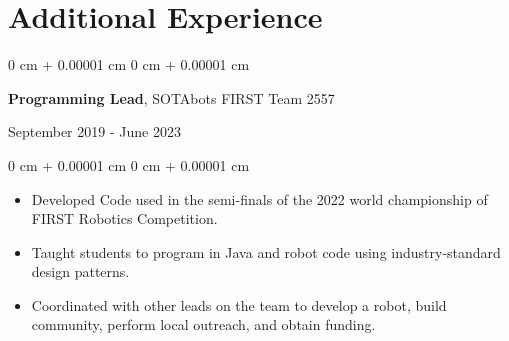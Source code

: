 \documentclass[10pt, article]{article}
\newenvironment{highlights}{
    \begin{itemize}[
        topsep=0.10 cm,
        parsep=0.10 cm,
        partopsep=0pt,
        itemsep=0pt,
        leftmargin=0 cm + 10pt
    ]
}{
    \end{itemize}
} %
\newenvironment{onecolentry}{
    \begin{adjustwidth}{
        0 cm + 0.00001 cm
    }{
        0 cm + 0.00001 cm
    }
}{
    \end{adjustwidth}
} %
\newenvironment{twocolentry}[2][]{
    \onecolentry
    \def\secondColumn{#2}
    \setcolumnwidth{\fill, 4.5 cm}
    \begin{paracol}{2}
}{
    \switchcolumn \raggedleft \secondColumn
    \end{paracol}
    \endonecolentry
} %
\begin{document}
    \section{Additional Experience}
    \begin{samepage}
       

      \begin{twocolentry}
        {September 2019 - June 2023}
        \textbf {Programming Lead}, SOTAbots FIRST Team 2557


      \end{twocolentry}
      \begin{onecolentry}
        \begin{highlights}
      \item Developed Code used in the semi-finals of the 2022 world championship of FIRST Robotics Competition.
      \item Taught students to program in Java and robot code using industry-standard design patterns.
      \item Coordinated with other leads on the team to develop a robot, build community, perform local outreach, and obtain funding.

        \end{highlights}
      \end{onecolentry}

    \end{samepage}
\end{document}
